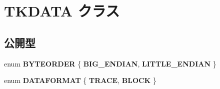 \hypertarget{class_t_k_d_a_t_a}{}\section{T\+K\+D\+A\+TA クラス}
\label{class_t_k_d_a_t_a}
\subsection*{公開型}
\begin{DoxyCompactItemize}
\item 
\mbox{\label{class_t_k_d_a_t_a_ab55f2c2d1c76bbeb3c1820ad2e749f38}} 
enum {\bfseries B\+Y\+T\+E\+O\+R\+D\+ER} \{ {\bfseries B\+I\+G\+\_\+\+E\+N\+D\+I\+AN}, 
{\bfseries L\+I\+T\+T\+L\+E\+\_\+\+E\+N\+D\+I\+AN}
 \}
\item 
\mbox{\label{class_t_k_d_a_t_a_add3f58dbf65c97f4c9998e3a8b3f79fd}} 
enum {\bfseries D\+A\+T\+A\+F\+O\+R\+M\+AT} \{ {\bfseries T\+R\+A\+CE}, 
{\bfseries B\+L\+O\+CK}
 \}
\end{DoxyCompactItemize}
